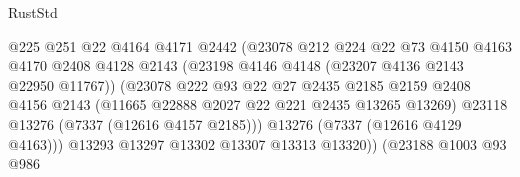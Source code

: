 \begin{lexlean}{RustStd}
\begin{coremodule}
                                            @225
                                            @251
                                            @22
                                            @4164
                                            @4171
                                            @2442
                                            (@23078
                                              @212
                                              @224
                                              @22
                                              @73
                                              @4150
                                              @4163
                                              @4170
                                              @2408
                                              @4128
                                              @2143
                                              (@23198
                                                @4146
                                                @4148
                                                (@23207 @4136 @2143 @22950 @11767))
                                              (@23078
                                                @222
                                                @93
                                                @22
                                                @27
                                                @2435
                                                @2185
                                                @2159
                                                @2408
                                                @4156
                                                @2143
                                                (@11665 @22888 @2027 @22 @221 @2435 @13265 @13269)
                                                @23118
                                                @13276
                                                (@7337 (@12616 @4157 @2185)))
                                              @13276
                                              (@7337 (@12616 @4129 @4163)))
                                            @13293
                                            @13297
                                            @13302
                                            @13307
                                            @13313
                                            @13320))
                                        (@23188
                                          @1003
                                          @93
                                          @986

\end{coremodule}
\end{lexlean}
